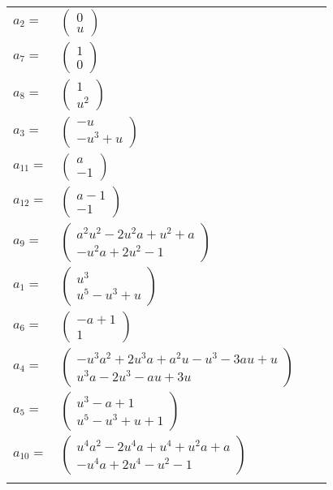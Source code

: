 \documentclass[1p]{elsarticle_modified}
\theoremstyle{definition}
\begin{document}
\begin{tabular}{m{7pt} m{180pt} m{7pt} m{180pt} }
\flushright $a_{2}=$&$\begin{pmatrix}0\\u\end{pmatrix}$ \\
\flushright $a_{7}=$&$\begin{pmatrix}1\\0\end{pmatrix}$ \\
\flushright $a_{8}=$&$\begin{pmatrix}1\\u^2\end{pmatrix}$ \\
\flushright $a_{3}=$&$\begin{pmatrix}- u\\- u^3+u\end{pmatrix}$ \\
\flushright $a_{11}=$&$\begin{pmatrix}a\\-1\end{pmatrix}$ \\
\flushright $a_{12}=$&$\begin{pmatrix}a-1\\-1\end{pmatrix}$ \\
\flushright $a_{9}=$&$\begin{pmatrix}a^2 u^2-2 u^2 a+u^2+a\\- u^2 a+2 u^2-1\end{pmatrix}$ \\
\flushright $a_{1}=$&$\begin{pmatrix}u^3\\u^5- u^3+u\end{pmatrix}$ \\
\flushright $a_{6}=$&$\begin{pmatrix}- a+1\\1\end{pmatrix}$ \\
\flushright $a_{4}=$&$\begin{pmatrix}- u^3 a^2+2 u^3 a+a^2 u- u^3-3 a u+u\\u^3 a-2 u^3- a u+3 u\end{pmatrix}$ \\
\flushright $a_{5}=$&$\begin{pmatrix}u^3- a+1\\u^5- u^3+u+1\end{pmatrix}$ \\
\flushright $a_{10}=$&$\begin{pmatrix}u^4 a^2-2 u^4 a+u^4+u^2 a+a\\- u^4 a+2 u^4- u^2-1\end{pmatrix}$\\&\end{tabular}
\end{document}
